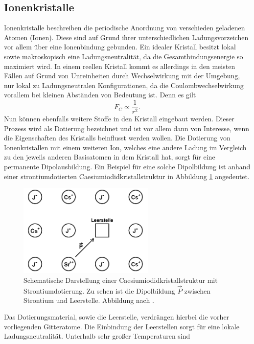 \subsection{Ionenkristalle}
Ionenkristalle beschreiben die periodische Anordnung von verschieden geladenen Atomen (Ionen). Diese sind auf Grund ihrer unterschiedlichen Ladungsvorzeichen vor allem über eine Ionenbindung 
gebunden. Ein idealer Kristall besitzt lokal sowie makroskopisch eine Ladungsneutralität, da die Gesamtbindungsenergie so maximiert wird. In einem reellen Kristall kommt es allerdings in den meisten Fällen auf Grund von 
Unreinheiten durch Wechselwirkung mit der Umgebung,
nur lokal zu Ladungsneutralen Konfigurationen, da die Coulombwechselwirkung vorallem bei kleinen Abständen von Bedeutung ist. Denn es gilt
\begin{equation*}
F_{C} \propto \frac{1}{r^2}.
\end{equation*}
\newline
Nun können ebenfalls weitere Stoffe in den Kristall eingebaut werden. Dieser Prozess wird als Dotierung bezeichnet und ist vor allem dann von Interesse, wenn die Eigenschaften des Kristalls 
beinflusst werden wollen. Die Dotierung von Ionenkristallen mit einem weiteren Ion, welches eine andere Ladung im Vergleich zu den jeweils anderen Basisatomen in dem Kristall hat, sorgt für eine permanente Dipolausbildung.
Ein Beispiel für eine solche Dipolbildung ist anhand einer strontiumdotierten Caesiumiodidkristallstruktur in Abbildung \ref{fig:theo1} angedeutet.
\begin{figure}
    \centering
    \includegraphics[width=0.6\textwidth]{bilder/theo1.png}
    \caption{Schematische Darstellung einer Caesiumiodidkristallstruktur mit Strontiumdotierung. Zu sehen ist die Dipolbildung $\vec{P}$ zwischen Strontium und Leerstelle. Abbildung nach \cite{altskript}.
            }
    \label{fig:theo1}
\end{figure}
Das Dotierungsmaterial, sowie die Leerstelle, verdrängen hierbei die vorher vorliegenden Gitteratome. Die Einbindung der Leerstellen sorgt für eine lokale Ladungsneutralität. Unterhalb sehr großer Temperaturen sind
